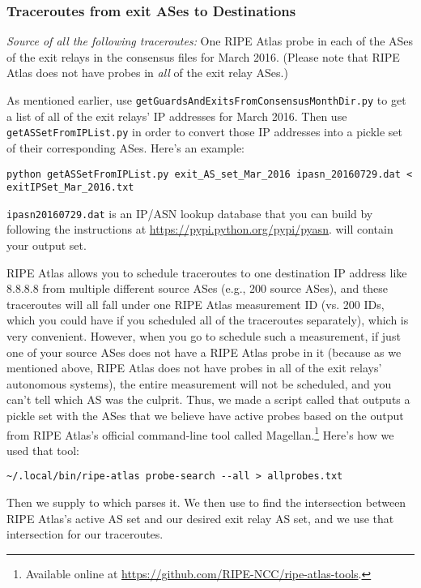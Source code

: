 \documentclass{article}
\begin{document}
\subsubsection{Traceroutes from exit ASes to Destinations}
\emph{Source of all the following traceroutes:} One RIPE Atlas probe in each of the ASes of the 
exit relays in the consensus files for March 2016. (Please note that RIPE Atlas does not 
have probes in \emph{all} of the exit relay ASes.)

As mentioned earlier, use {\tt getGuardsAndExitsFromConsensusMonthDir.py} to get a 
list of all of the exit relays' IP addresses for March 2016. 
Then use {\tt getASSetFromIPList.py} 
in order to convert those IP addresses into a pickle set 
of their corresponding ASes. Here's an example:
\begin{lstlisting}
python getASSetFromIPList.py exit_AS_set_Mar_2016 ipasn_20160729.dat < exitIPSet_Mar_2016.txt
\end{lstlisting}
{\tt ipasn\textunderscore 20160729.dat} is an IP/ASN lookup database that you can build 
by following the instructions at \url{https://pypi.python.org/pypi/pyasn}.
 will contain your output set.

RIPE Atlas allows you to schedule traceroutes to one destination IP address 
like 8.8.8.8 from multiple different source ASes (e.g., 200 source ASes), and these 
traceroutes will all fall under one RIPE Atlas measurement ID (vs. 200 IDs, which 
you could have if you scheduled all of the traceroutes separately), which is very 
convenient. However, when you go to schedule such a measurement, if just one of your 
source ASes does not have a RIPE Atlas probe in it (because as we mentioned above, 
RIPE Atlas does not have probes in all of the exit relays' autonomous systems),
the entire measurement will not be 
scheduled, and you can't tell which AS was the culprit. Thus, we made a script 
called  that outputs a pickle set with the 
ASes that we believe have active probes based on the output from RIPE Atlas's 
official command-line tool called Magellan.\footnote{Available online at
\url{https://github.com/RIPE-NCC/ripe-atlas-tools}.} 
Here's how we used that tool:
\begin{lstlisting}
~/.local/bin/ripe-atlas probe-search --all > allprobes.txt
\end{lstlisting}
Then we supply  to  which 
parses it. We then use 
to find the intersection 
between RIPE Atlas's active AS set and our desired exit relay AS set, and 
we use that intersection for our traceroutes.
\end{document}
